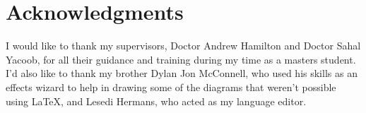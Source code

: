 \section*{Acknowledgments}
I would like to thank my supervisors, Doctor Andrew Hamilton and Doctor Sahal Yacoob, for all their guidance and training during my time as a masters student. I'd also like to thank my brother Dylan Jon McConnell, who used his skills as an effects wizard to help in drawing some of the diagrams that weren't possible using \LaTeX, and Lesedi Hermans, who acted as my language editor.